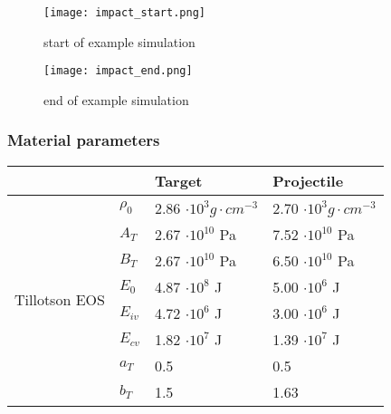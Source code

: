 \begin{figure}[H]
    \centering
    \texttt{[image: impact\_start.png]}
    \caption{start of example simulation}
    \label{fig:impact_start}
\end{figure}

\begin{figure}[H]
    \centering
    \texttt{[image: impact\_end.png]}
    \caption{end of example simulation}
    \label{fig:impact_end}
\end{figure}

\subsubsection{Material parameters}

\begin{table}
    \centering
    \begin{tabular}{ |l|l|l|l| }
        \hline
        \multicolumn{2}{|c|}{}                & Target                & Projectile                                                          \\
        \hline
        \multirow{10}{*}{Tillotson EOS}       & $\rho_0$              & 2.86 $\cdot 10^3 g\cdot cm^{-3}$ & 2.70 $\cdot 10^3 g\cdot cm^{-3}$ \\
                                              & $A_T$                 & 2.67 $\cdot 10^{10}$ Pa          & 7.52 $\cdot 10^{10}$ Pa          \\
                                              & $B_T$                 & 2.67 $\cdot 10^{10}$ Pa          & 6.50 $\cdot 10^{10}$ Pa          \\
                                              & $E_0$                 & 4.87 $\cdot 10^8$ J              & 5.00 $\cdot 10^6$ J              \\
                                              & $E_{iv}$              & 4.72 $\cdot 10^6$ J              & 3.00 $\cdot 10^6$ J              \\
                                              & $E_{cv}$              & 1.82 $\cdot 10^7$ J              & 1.39 $\cdot 10^7$ J              \\
                                              & $a_T$                 & 0.5                              & 0.5                              \\
                                              & $b_T$                 & 1.5                              & 1.63                             \\

\end{tabular}
\end{table}
